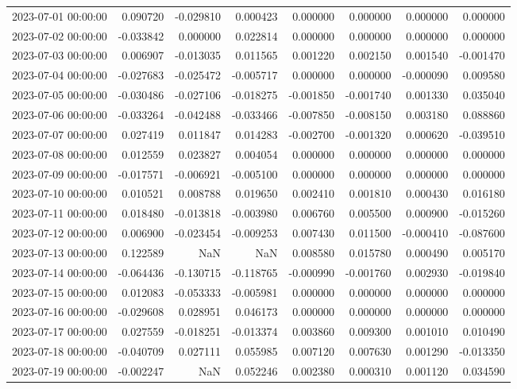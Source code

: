 \begin{tabular}{lrrrrrrr}
2023-07-01 00:00:00 & 0.090720 & -0.029810 & 0.000423 & 0.000000 & 0.000000 & 0.000000 & 0.000000 \\
2023-07-02 00:00:00 & -0.033842 & 0.000000 & 0.022814 & 0.000000 & 0.000000 & 0.000000 & 0.000000 \\
2023-07-03 00:00:00 & 0.006907 & -0.013035 & 0.011565 & 0.001220 & 0.002150 & 0.001540 & -0.001470 \\
2023-07-04 00:00:00 & -0.027683 & -0.025472 & -0.005717 & 0.000000 & 0.000000 & -0.000090 & 0.009580 \\
2023-07-05 00:00:00 & -0.030486 & -0.027106 & -0.018275 & -0.001850 & -0.001740 & 0.001330 & 0.035040 \\
2023-07-06 00:00:00 & -0.033264 & -0.042488 & -0.033466 & -0.007850 & -0.008150 & 0.003180 & 0.088860 \\
2023-07-07 00:00:00 & 0.027419 & 0.011847 & 0.014283 & -0.002700 & -0.001320 & 0.000620 & -0.039510 \\
2023-07-08 00:00:00 & 0.012559 & 0.023827 & 0.004054 & 0.000000 & 0.000000 & 0.000000 & 0.000000 \\
2023-07-09 00:00:00 & -0.017571 & -0.006921 & -0.005100 & 0.000000 & 0.000000 & 0.000000 & 0.000000 \\
2023-07-10 00:00:00 & 0.010521 & 0.008788 & 0.019650 & 0.002410 & 0.001810 & 0.000430 & 0.016180 \\
2023-07-11 00:00:00 & 0.018480 & -0.013818 & -0.003980 & 0.006760 & 0.005500 & 0.000900 & -0.015260 \\
2023-07-12 00:00:00 & 0.006900 & -0.023454 & -0.009253 & 0.007430 & 0.011500 & -0.000410 & -0.087600 \\
2023-07-13 00:00:00 & 0.122589 & NaN & NaN & 0.008580 & 0.015780 & 0.000490 & 0.005170 \\
2023-07-14 00:00:00 & -0.064436 & -0.130715 & -0.118765 & -0.000990 & -0.001760 & 0.002930 & -0.019840 \\
2023-07-15 00:00:00 & 0.012083 & -0.053333 & -0.005981 & 0.000000 & 0.000000 & 0.000000 & 0.000000 \\
2023-07-16 00:00:00 & -0.029608 & 0.028951 & 0.046173 & 0.000000 & 0.000000 & 0.000000 & 0.000000 \\
2023-07-17 00:00:00 & 0.027559 & -0.018251 & -0.013374 & 0.003860 & 0.009300 & 0.001010 & 0.010490 \\
2023-07-18 00:00:00 & -0.040709 & 0.027111 & 0.055985 & 0.007120 & 0.007630 & 0.001290 & -0.013350 \\
2023-07-19 00:00:00 & -0.002247 & NaN & 0.052246 & 0.002380 & 0.000310 & 0.001120 & 0.034590 \\

\end{tabular}
